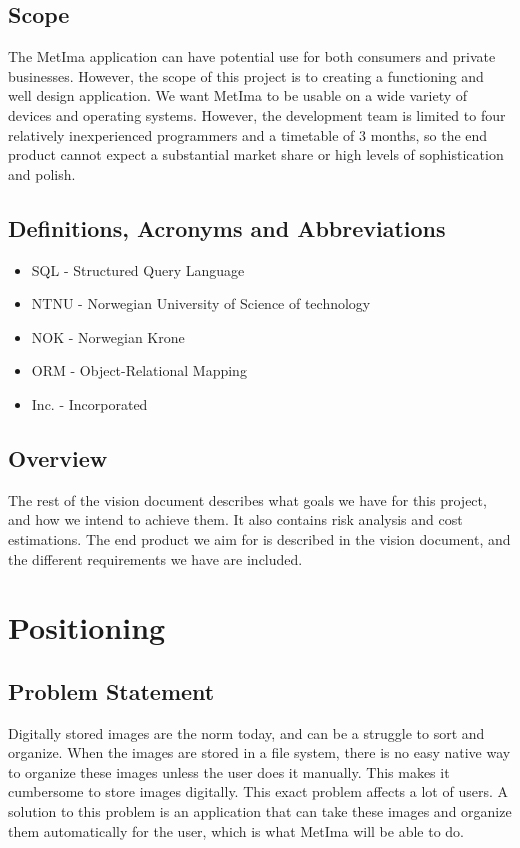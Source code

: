 \documentclass{article}
\begin{document}
\subsection{Scope}
The MetIma application can have potential use for both  consumers and private businesses. However, the scope of this project is to creating a functioning and well design application. We want MetIma to be usable on a wide variety of devices and operating systems. However, the development team is limited to four relatively inexperienced programmers and a timetable of 3 months, so the end product cannot expect a substantial market share or high levels of sophistication and polish.
\subsection{Definitions, Acronyms and Abbreviations}
\begin{itemize}
    \item SQL - Structured Query Language
    \item NTNU - Norwegian University of Science of technology
    \item NOK - Norwegian Krone
    \item ORM - Object-Relational Mapping
    \item Inc. - Incorporated

\end{itemize}{}
\subsection{Overview}
The rest of the vision document describes what goals we have for this project, and how we intend to achieve them. It also contains risk analysis and cost estimations. The end product we aim for is described in the vision document, and the different requirements we have are included.

\section{Positioning}
\subsection{Problem Statement}
Digitally stored images are the norm today, and can be a struggle to sort and organize. When the images are stored in a file system, there is no easy native way to organize these images unless the user does it manually. This makes it cumbersome to store images digitally. This exact problem affects a lot of users. A solution to this problem is an application that can take these images and organize them automatically for the user, which is what MetIma will be able to do. 
\end{document}
